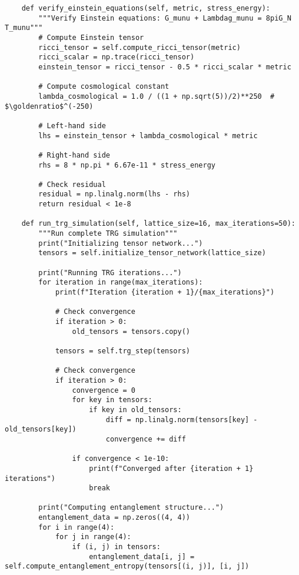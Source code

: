 \documentclass[11pt]{article}
\theoremstyle{definition}
\newcommand{\goldenratio}{\phi}
\begin{document}
\begin{verbatim}
    def verify_einstein_equations(self, metric, stress_energy):
        """Verify Einstein equations: G_munu + Lambdag_munu = 8piG_N T_munu"""
        # Compute Einstein tensor
        ricci_tensor = self.compute_ricci_tensor(metric)
        ricci_scalar = np.trace(ricci_tensor)
        einstein_tensor = ricci_tensor - 0.5 * ricci_scalar * metric
        
        # Compute cosmological constant
        lambda_cosmological = 1.0 / ((1 + np.sqrt(5))/2)**250  # $\goldenratio$^(-250)
        
        # Left-hand side
        lhs = einstein_tensor + lambda_cosmological * metric
        
        # Right-hand side
        rhs = 8 * np.pi * 6.67e-11 * stress_energy
        
        # Check residual
        residual = np.linalg.norm(lhs - rhs)
        return residual < 1e-8
    
    def run_trg_simulation(self, lattice_size=16, max_iterations=50):
        """Run complete TRG simulation"""
        print("Initializing tensor network...")
        tensors = self.initialize_tensor_network(lattice_size)
        
        print("Running TRG iterations...")
        for iteration in range(max_iterations):
            print(f"Iteration {iteration + 1}/{max_iterations}")
            
            # Check convergence
            if iteration > 0:
                old_tensors = tensors.copy()
            
            tensors = self.trg_step(tensors)
            
            # Check convergence
            if iteration > 0:
                convergence = 0
                for key in tensors:
                    if key in old_tensors:
                        diff = np.linalg.norm(tensors[key] - old_tensors[key])
                        convergence += diff
                
                if convergence < 1e-10:
                    print(f"Converged after {iteration + 1} iterations")
                    break
        
        print("Computing entanglement structure...")
        entanglement_data = np.zeros((4, 4))
        for i in range(4):
            for j in range(4):
                if (i, j) in tensors:
                    entanglement_data[i, j] = self.compute_entanglement_entropy(tensors[(i, j)], [i, j])
        

\end{verbatim}
\end{document}
